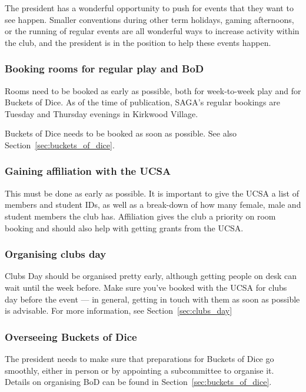 The president has a wonderful opportunity to push for events that they want to see happen. Smaller conventions during other term holidays, gaming afternoons, or the running of regular events are all wonderful ways to increase activity within the club, and the president is in the position to help these events happen.

\subsubsection{Booking rooms for regular play and BoD}

Rooms need to be booked as early as possible, both for week-to-week play and for Buckets of Dice. As of the time of publication, SAGA's regular bookings are Tuesday and Thursday evenings in Kirkwood Village.

Buckets of Dice needs to be booked as soon as possible. See also Section~\ref{sec:buckets_of_dice}.

\subsubsection{Gaining affiliation with the UCSA}

This must be done as early as possible. It is important to give the UCSA a list of members and student IDs, as well as a break-down of how many female, male and student members the club has. Affiliation gives the club a priority on room booking and should also help with getting grants from the UCSA.

\subsubsection{Organising clubs day}

Clubs Day should be organised pretty early, although getting people on desk can wait until the week before. Make sure you've booked with the UCSA for clubs day before the event --- in general, getting in touch with them as soon as possible is advisable. For more information, see Section~\ref{sec:clubs_day}

\subsubsection{Overseeing Buckets of Dice}

The president needs to make sure that preparations for Buckets of Dice go smoothly, either in person or by appointing a subcommittee to organise it. Details on organising BoD can be found in Section~\ref{sec:buckets_of_dice}.

